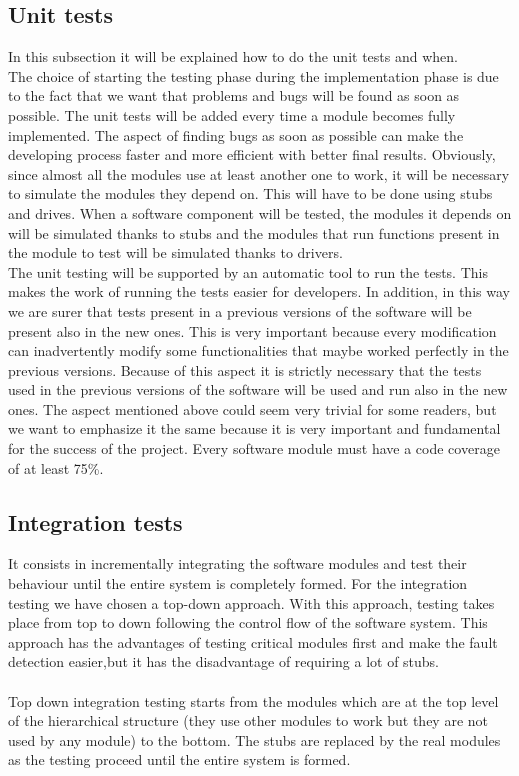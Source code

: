 \documentclass[titlepage]{article}
\begin{document}
\subsection{Unit tests}
In this subsection it will be explained how to do the unit tests and when.\\
The choice of starting the testing phase during the implementation phase is due to the fact that we want that problems and bugs will be found as soon as possible. The unit tests will be added every time a module becomes fully implemented. The aspect of finding bugs as soon as possible can make the developing process faster and more efficient with better final results. Obviously, since almost all the modules use at least another one to work, it will be necessary to simulate the modules they depend on. This will have to be done using stubs and drives. When a software component will be tested, the modules it depends on will be simulated thanks to stubs and the modules that run functions present in the module to test will be simulated thanks to drivers.\\
The unit testing will be supported by an automatic tool to run the tests. This makes the work of running the tests easier for developers. In addition, in this way we are surer that tests present in a previous versions of the software will be present also in the  new ones. This is very important because every modification can inadvertently modify some functionalities that maybe worked perfectly in the previous versions. Because of this aspect it is strictly necessary that the tests used in the previous versions of the software will be used and run also in the new ones. The aspect mentioned above could seem very trivial for some readers, but we want to emphasize it the same because it is very important and fundamental for the success of the project. Every software module must have a code coverage of at least 75\%.
\subsection{Integration tests}
It consists in incrementally integrating the software modules and test their behaviour until the entire system is completely formed. For the integration testing we have chosen a top-down approach. With this approach, testing takes place from top to down following the control flow of the software system. This approach has the advantages of testing critical modules first and make the fault detection easier,but it has the disadvantage of requiring a lot of  stubs. \\ \\
Top down integration testing starts from the modules which are at the top level of the hierarchical structure (they use other modules to work but they are not used by any module) to the bottom. The stubs are replaced by the real modules as the testing proceed until the entire system is formed.
\end{document}

